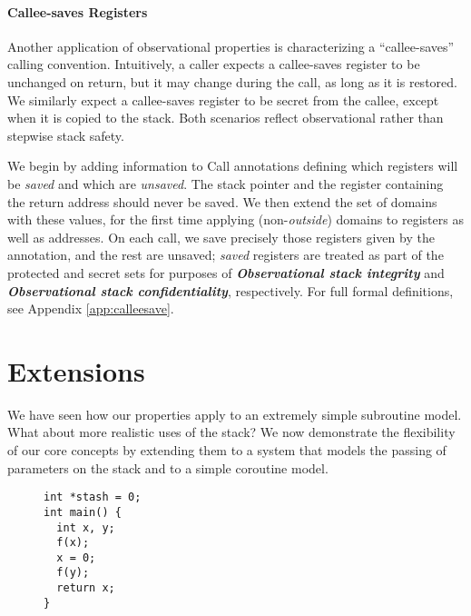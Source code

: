 \documentclass[10pt,conference]{ieeetran}%
\theoremstyle{definition}
\begin{document}
{\medskip
\paragraph*{Callee-saves Registers}
\label{sec:callee}

Another application of observational properties is characterizing a ``callee-saves''
calling convention. Intuitively, a caller expects a callee-saves register to be unchanged on
return, but it may change during the call, as long as it is restored. We similarly expect a callee-saves
register to be secret from the callee, except when it is copied to the stack. Both scenarios
reflect observational rather than stepwise stack safety.

We begin by adding information to Call annotations defining which registers will be {\em saved}
and which are {\em unsaved}. The stack pointer and the register containing the return address
should never be saved. We then extend the set of domains with these values, for the first time applying
(non-{\em outside}) domains to registers as well as addresses. On each call, we save precisely those
registers given by the annotation, and the rest are unsaved; {\em saved} registers are treated as part
of the protected and secret sets for purposes of \textbf{\em Observational stack integrity} and
\textbf{\em Observational stack confidentiality}, respectively. For full formal definitions, see
Appendix \ref{app:calleesave}.

\section{Extensions}
\label{sec:ext}

We have seen how our properties apply to an extremely simple
subroutine model.
What about more realistic uses of the stack? We now demonstrate the
flexibility of our core concepts by extending
them to a system that models the passing of
parameters on the stack and to a simple coroutine model.

\newcommand{\mainpassc}{magenta}

\begin{figure*}
  \centering
  \begin{subfigure}[t]{.2\textwidth}
{\small
\begin{lstlisting}
int *stash = 0;
int main() {
  int x, y;
  f(x);
  x = 0;
  f(y);
  return x;
}






\end{lstlisting}}
\end{subfigure}
\end{figure*}}
\end{document}
